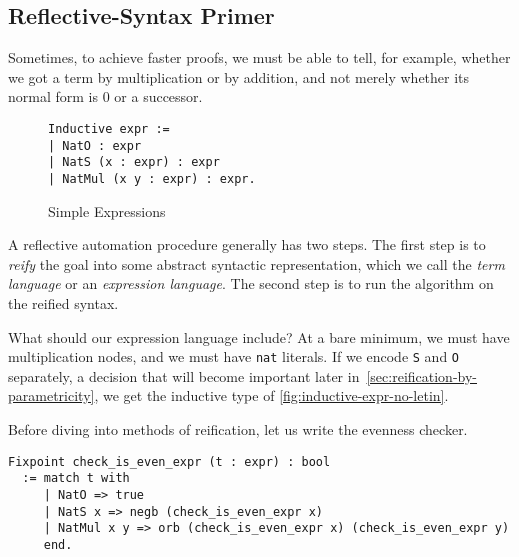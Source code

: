 \subsection{Reflective-Syntax Primer}
Sometimes, to achieve faster proofs, we must be able to tell, for example, whether we got a term by multiplication or by addition, and not merely whether its normal form is 0 or a successor.%

\begin{wrapfigure}[4]{r}{6cm}
\begin{verbatim}
Inductive expr :=
| NatO : expr
| NatS (x : expr) : expr
| NatMul (x y : expr) : expr.
\end{verbatim}
\caption{Simple Expressions}\label{fig:inductive-expr-no-letin}
\end{wrapfigure}

A reflective automation procedure generally has two steps.
The first step is to \emph{reify} the goal into some abstract syntactic representation, which we call the \emph{term language} or an \emph{expression language}.
The second step is to run the algorithm on the reified syntax.

What should our expression language include?
At a bare minimum, we must have multiplication nodes, and we must have \texttt{nat} literals.
If we encode \texttt{S} and \texttt{O} separately, a decision that will become important later in~\autoref{sec:reification-by-parametricity}, we get the inductive type of \autoref{fig:inductive-expr-no-letin}.

Before diving into methods of reification, let us write the evenness checker.
\begin{verbatim}
Fixpoint check_is_even_expr (t : expr) : bool
  := match t with
     | NatO => true
     | NatS x => negb (check_is_even_expr x)
     | NatMul x y => orb (check_is_even_expr x) (check_is_even_expr y)
     end.
\end{verbatim}

